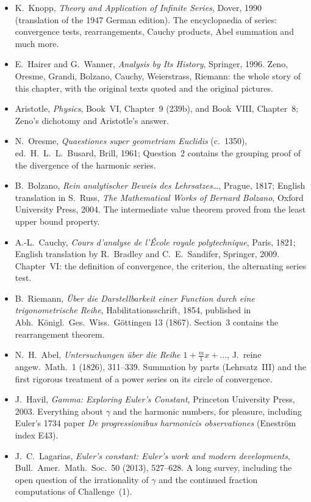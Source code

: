 \begin{itemize}\raggedright
\item K.~Knopp, \emph{Theory and Application of Infinite Series}, Dover, 1990 (translation of the 1947 German edition). The encyclopaedia of series: convergence tests, rearrangements, Cauchy products, Abel summation and much more.
\item E.~Hairer and G.~Wanner, \emph{Analysis by Its History}, Springer, 1996. Zeno, Oresme, Grandi, Bolzano, Cauchy, Weierstrass, Riemann: the whole story of this chapter, with the original texts quoted and the original pictures.
\item Aristotle, \emph{Physics}, Book~VI, Chapter~9 (239b), and Book~VIII, Chapter~8; Zeno's dichotomy and Aristotle's answer.
\item N.~Oresme, \emph{Quaestiones super geometriam Euclidis} (c.~1350), ed.\ H.~L.~L.~Busard, Brill, 1961; Question~2 contains the grouping proof of the divergence of the harmonic series.
\item B.~Bolzano, \emph{Rein analytischer Beweis des Lehrsatzes\dots}, Prague, 1817; English translation in S.~Russ, \emph{The Mathematical Works of Bernard Bolzano}, Oxford University Press, 2004. The intermediate value theorem proved from the least upper bound property.
\item A.-L.~Cauchy, \emph{Cours d'analyse de l'\'Ecole royale polytechnique}, Paris, 1821; English translation by R.~Bradley and C.~E.~Sandifer, Springer, 2009. Chapter~VI: the definition of convergence, the criterion, the alternating series test.
\item B.~Riemann, \emph{\"Uber die Darstellbarkeit einer Function durch eine trigonometrische Reihe}, Habilitationsschrift, 1854, published in Abh.\ K\"onigl.\ Ges.\ Wiss.\ G\"ottingen 13 (1867). Section~3 contains the rearrangement theorem.
\item N.~H.~Abel, \emph{Untersuchungen \"uber die Reihe $1+\frac m1x+\dots$}, J.\ reine angew.\ Math.\ 1 (1826), 311--339. Summation by parts (Lehrsatz~III) and the first rigorous treatment of a power series on its circle of convergence.
\item J.~Havil, \emph{Gamma: Exploring Euler's Constant}, Princeton University Press, 2003. Everything about $\gamma$ and the harmonic numbers, for pleasure, including Euler's 1734 paper \emph{De progressionibus harmonicis observationes} (Eneström index E43).
\item J.~C.~Lagarias, \emph{Euler's constant: Euler's work and modern developments}, Bull.\ Amer.\ Math.\ Soc.\ 50 (2013), 527--628. A long survey, including the open question of the irrationality of $\gamma$ and the continued fraction computations of Challenge~(1).

\end{itemize}
